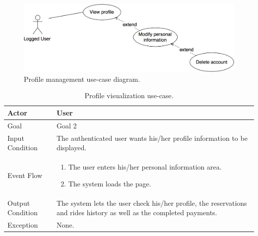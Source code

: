 \begin{figure}[H]
\begin{center}
		\includegraphics[width=\textwidth]{./specific_requirements/features/diagrams/man_profile_uc.png}
		\caption{Profile management use-case diagram.}
		\label{man_profile_uc}
\end{center}
\end{figure}

\begin{table}[H]
\begin{center}
\begin{tabular}{p{} | p{}}
\hline
Actor & User\\
\hline
Goal & Goal 2\\
\hline
Input Condition & The authenticated user wants his/her profile information to be displayed.\\
\hline
Event Flow & 
\begin{enumerate}
\item The user enters his/her personal information area.
\item The system loads the page.
\end{enumerate} \\
\hline
Output Condition & The system lets the user check his/her profile, the reservations and rides history as well as the completed payments.\\
\hline
Exception & 
None.\\
\hline
\end{tabular}
\end{center}
\caption{Profile visualization use-case.}
\label{view_profile_uc}
\end{table}

